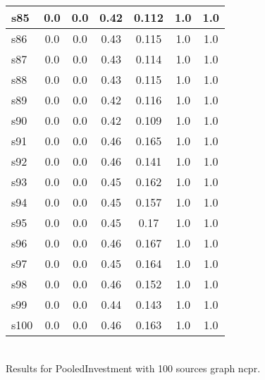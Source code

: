 \documentclass{article}
\begin{document}
\begin{tabular}{|l|c|c|c|c|c|c|}
\hline
s85 &0.0 & 0.0 & 0.42 & 0.112 & 1.0 & 1.0\\
\hline
s86 &0.0 & 0.0 & 0.43 & 0.115 & 1.0 & 1.0\\
\hline
s87 &0.0 & 0.0 & 0.43 & 0.114 & 1.0 & 1.0\\
\hline
s88 &0.0 & 0.0 & 0.43 & 0.115 & 1.0 & 1.0\\
\hline
s89 &0.0 & 0.0 & 0.42 & 0.116 & 1.0 & 1.0\\
\hline
s90 &0.0 & 0.0 & 0.42 & 0.109 & 1.0 & 1.0\\
\hline
s91 &0.0 & 0.0 & 0.46 & 0.165 & 1.0 & 1.0\\
\hline
s92 &0.0 & 0.0 & 0.46 & 0.141 & 1.0 & 1.0\\
\hline
s93 &0.0 & 0.0 & 0.45 & 0.162 & 1.0 & 1.0\\
\hline
s94 &0.0 & 0.0 & 0.45 & 0.157 & 1.0 & 1.0\\
\hline
s95 &0.0 & 0.0 & 0.45 & 0.17 & 1.0 & 1.0\\
\hline
s96 &0.0 & 0.0 & 0.46 & 0.167 & 1.0 & 1.0\\
\hline
s97 &0.0 & 0.0 & 0.45 & 0.164 & 1.0 & 1.0\\
\hline
s98 &0.0 & 0.0 & 0.46 & 0.152 & 1.0 & 1.0\\
\hline
s99 &0.0 & 0.0 & 0.44 & 0.143 & 1.0 & 1.0\\
\hline
s100 &0.0 & 0.0 & 0.46 & 0.163 & 1.0 & 1.0\\
\hline
\end{tabular}\\

\noindent Results for PooledInvestment with 100 sources graph ncpr.
\end{document}
